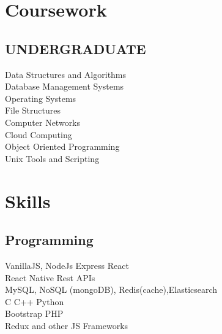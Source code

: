 \documentclass[]{deedy-resume-openfont}
\begin{document}
\begin{minipage}[t]{0.33\textwidth}

\section{Coursework}
\subsection{UNDERGRADUATE}
Data Structures and Algorithms\\
Database Management Systems\\
Operating Systems\\
File Structures\\
Computer Networks\\
Cloud Computing\\
Object Oriented Programming\\
Unix Tools and Scripting\\
\sectionsep


\section{Skills}
\subsection{Programming}
VanillaJS, NodeJs \textbullet{} Express \textbullet{} 
React \\ \textbullet{} React Native \textbullet{} Rest APIs\\
\textbullet{} MySQL, NoSQL (mongoDB),
Redis(cache),Elasticsearch\\ 
\textbullet{} C \textbullet{} C++ \textbullet{} Python\\
\textbullet{} Bootstrap \textbullet{} PHP\\
\textbullet{} Redux and other JS Frameworks
\sectionsep

%
%

\end{minipage} 
\hfill
\end{document}
